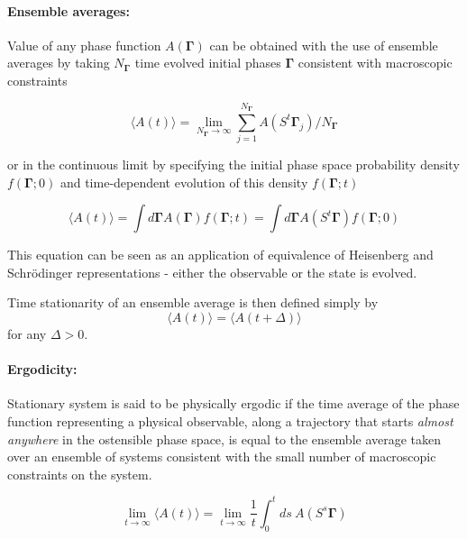 \documentclass[a4paper,12pt]{article}
\begin{document}
\paragraph{Ensemble averages:}

Value of any phase function $A(\bm{\Gamma})$ can be obtained with the use of ensemble averages by taking $N_{\bm{\Gamma}} $ time evolved initial phases $\bm{\Gamma}$ consistent with macroscopic constraints

\begin{equation}
  \langle A(t) \rangle = \lim_{N_{\bm{\Gamma}}
 \to \infty} \sum_{j=1}^{N_{\bm{\Gamma}}} A(S^t \bm{\Gamma}_j)/N_{\bm{\Gamma}}
\end{equation}

or in the continuous limit by specifying the initial phase space probability density $f(\bm{\Gamma};0)$ and time-dependent evolution of this density $f(\bm{\Gamma};t)$

\begin{equation}
  \langle A(t) \rangle = \int d\bm{\Gamma} A(\bm{\Gamma}) f(\bm{\Gamma};t) = \int d\bm{\Gamma} A(S^t\bm{\Gamma})f(\bm{\Gamma};0)
\end{equation}

This equation can be seen as an application of equivalence of Heisenberg and Schrödinger representations - either the observable or the state is evolved.

Time stationarity of an ensemble average is then defined simply by
\begin{equation}
\label{StationaryStateDef}
    \langle A(t) \rangle =   \langle A(t+\Delta) \rangle
\end{equation}
for any $\Delta > 0$.


\paragraph{Ergodicity:}
Stationary system is said to be physically ergodic if the time average of the phase function representing a physical observable, along a trajectory that starts \textit{almost anywhere}\cite{Evans:2016tq} in the ostensible phase space, is equal to the ensemble average taken over an ensemble of systems consistent with the small number of macroscopic constraints on the system.

\begin{equation}
    \lim_{t \to \infty} \langle A(t) \rangle = \lim_{t \to \infty} \frac{1}{t} \int_0^t ds\ A(S^s \bm{\Gamma})
\end{equation}
\end{document}
